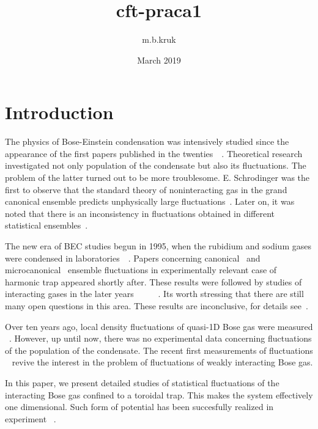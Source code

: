 \documentclass[aps,pra,reprint]{revtex4-2}
\title{cft-praca1}
\author{m.b.kruk }
\date{March 2019}
\begin{document}
\section{Introduction}
    The physics of Bose-Einstein condensation was intensively studied since the appearance of the first papers published in the twenties~\cite{bose1924plancks}~\cite{einstein1924quantentheorie}. Theoretical research investigated not only population of the condensate but also its fluctuations. The problem of the latter turned out to be more troublesome. E. Schrodinger was the first to observe that the standard theory of noninteracting gas in the grand canonical ensemble predicts unphysically large fluctuations~\cite{schrodinger1989statistical}. Later on, it was noted that there is an inconsistency in fluctuations obtained in different statistical ensembles~\cite{ziff1977ideal}. 
    
    The new era of BEC studies begun in 1995, when the rubidium and sodium gases were condensed in laboratories~\cite{davis1995bose}~\cite{anderson1995observation}. Papers concerning canonical~\cite{politzer1996condensate} and microcanonical~\cite{navez1997fourth} ensemble fluctuations in experimentally relevant case of harmonic trap appeared shortly after. 
    These results were followed by studies of interacting gases in the later years ~\cite{bienias2011statisticala}~\cite{bienias2011statistical}~\cite{PhysRevA.93.023636}~\cite{PhysRevLett.97.190402}~\cite{PhysRevLett.82.4376}. Its worth stressing that there are still many open questions in this area. These results are inconclusive, for details see~\cite{kristensen2019observation}.
    
    Over ten years ago, local density fluctuations of quasi-1D Bose gas were measured ~\cite{esteve2006observations}. However, up until now, there was no experimental data concerning fluctuations of the population of the condensate. The recent first measurements of fluctuations ~\cite{kristensen2019observation} revive the interest in the problem of fluctuations of weakly interacting Bose gas.
    
    In this paper, we present detailed studies of statistical fluctuations of the interacting Bose gas confined to a toroidal trap. This makes the system effectively one dimensional.
     Such form of potential has been succesfully realized in experiment ~\cite{meinert2015probing}.
     
\end{document}
